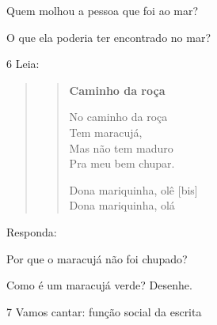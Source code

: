 \begin{escolha}
\item Quem molhou a pessoa que foi ao mar?


\item O que ela poderia ter encontrado no mar?

\end{escolha}

\num{6} Leia:


\begin{quote}
\begin{verse}
\textbf{Caminho da roça}

No caminho da roça\\
Tem maracujá,\\
Mas não tem maduro\\
Pra meu bem chupar.

Dona mariquinha, olê {[}bis{]}\\
Dona mariquinha, olá
\end{verse}

\end{quote}

Responda:

\begin{escolha}
\item Por que o maracujá não foi chupado?


\item Como é um maracujá verde? Desenhe.

\begin{mdframed}[linewidth=2pt,linecolor=salmao,roundcorner=10pt]
\vspace{5cm}
\end{mdframed}
\end{escolha}

\num{7} Vamos cantar: função social da escrita


